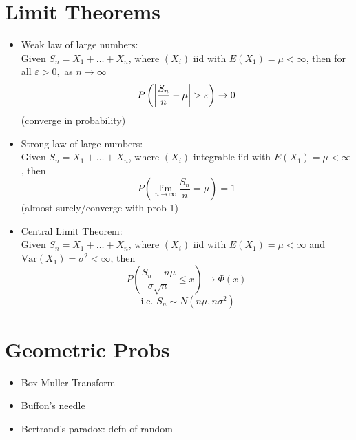 \section{Limit Theorems}
\begin{itemize}
      \item Weak law of large numbers: \\
            Given $S_n = X_1 + \dots + X_n$, where $(X_i)$ iid with $E(X_1) = \mu <\infty $, then for all $\varepsilon >0,$ as $n \to \infty$ \[ P \left( \left| \frac{S_n}{n}-\mu \right| > \varepsilon \right) \to 0\]
            (converge in probability)
      \item Strong law of large numbers: \\
            Given $S_n = X_1 + \dots + X_n$, where $(X_i)$ integrable iid with $E(X_1) = \mu <\infty $, then \[P \left( \lim_{n\to \infty} \frac{S_n}{n} = \mu \right) = 1 \]
            (almost surely/converge with prob 1)
      \item Central Limit Theorem: \\
            Given $S_n = X_1 + \dots + X_n$, where $(X_i)$ iid with $E(X_1) = \mu < \infty$ and $\text{Var}(X_1) = \sigma^2 < \infty$, then \[P \left( \frac{S_n - n\mu}{\sigma \sqrt{n}} \leq x \right) \to \Phi(x) \]
            \[\text{ i.e. } S_n \sim N(n\mu, n\sigma^2) \]
\end{itemize}

\section{Geometric Probs}
\begin{itemize}
      \item Box Muller Transform
      \item Buffon's needle
      \item Bertrand's paradox: defn of random
\end{itemize}

